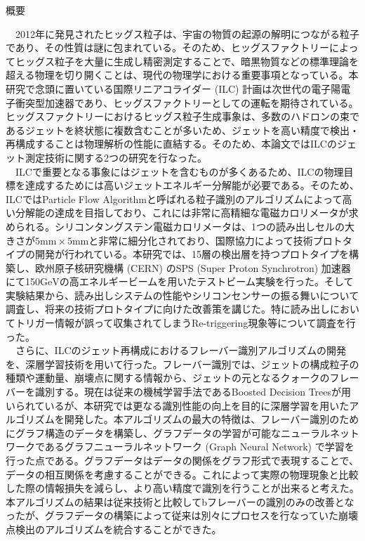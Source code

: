 
\ifabstract
 \maketitle
\fi
\begin{center}
{\LARGE 概要}\\
\end{center}
　2012年に発見されたヒッグス粒子は、宇宙の物質の起源の解明につながる粒子であり、その性質は謎に包まれている。そのため、ヒッグスファクトリーによってヒッグス粒子を大量に生成し精密測定することで、暗黒物質などの標準理論を超える物理を切り開くことは、現代の物理学における重要事項となっている。本研究で念頭に置いている国際リニアコライダー (ILC) 計画は次世代の電子陽電子衝突型加速器であり、ヒッグスファクトリーとしての運転を期待されている。ヒッグスファクトリーにおけるヒッグス粒子生成事象は、多数のハドロンの束であるジェットを終状態に複数含むことが多いため、ジェットを高い精度で検出・再構成することは物理解析の性能に直結する。そのため、本論文ではILCのジェット測定技術に関する2つの研究を行なった。\\
　ILCで重要となる事象にはジェットを含むものが多くあるため、ILCの物理目標を達成するためには高いジェットエネルギー分解能が必要である。そのため、ILCではParticle Flow Algorithmと呼ばれる粒子識別のアルゴリズムによって高い分解能の達成を目指しており、これには非常に高精細な電磁カロリメータが求められる。シリコンタングステン電磁カロリメータは、1つの読み出しセルの大きさが$5\mathrm{mm} \times 5\mathrm{mm}$と非常に細分化されており、国際協力によって技術プロトタイプの開発が行われている。本研究では、15層の検出層を持つプロトタイプを構築し、欧州原子核研究機構 (CERN) のSPS (Super Proton Synchrotron) 加速器にて150$\mathrm{GeV}$の高エネルギービームを用いたテストビーム実験を行った。そして実験結果から、読み出しシステムの性能やシリコンセンサーの振る舞いについて調査し、将来の技術プロトタイプに向けた改善策を講じた。特に読み出しにおいてトリガー情報が誤って収集されてしまうRe-triggering現象等について調査を行った。\\
　さらに、ILCのジェット再構成におけるフレーバー識別アルゴリズムの開発を、深層学習技術を用いて行った。フレーバー識別では、ジェットの構成粒子の種類や運動量、崩壊点に関する情報から、ジェットの元となるクォークのフレーバーを識別する。現在は従来の機械学習手法であるBoosted Decision Treesが用いられているが、本研究では更なる識別性能の向上を目的に深層学習を用いたアルゴリズムを開発した。本アルゴリズムの最大の特徴は、フレーバー識別のためにグラフ構造のデータを構築し、グラフデータの学習が可能なニューラルネットワークであるグラフニューラルネットワーク (Graph Neural Network) で学習を行った点である。グラフデータはデータの関係をグラフ形式で表現することで、データの相互関係を考慮することができる。これによって実際の物理現象と比較した際の情報損失を減らし、より高い精度で識別を行うことが出来ると考えた。本アルゴリズムの結果は従来技術と比較してbフレーバーの識別のみの改善となったが、グラフデータの構築によって従来は別々にプロセスを行なっていた崩壊点検出のアルゴリズムを統合することができた。
